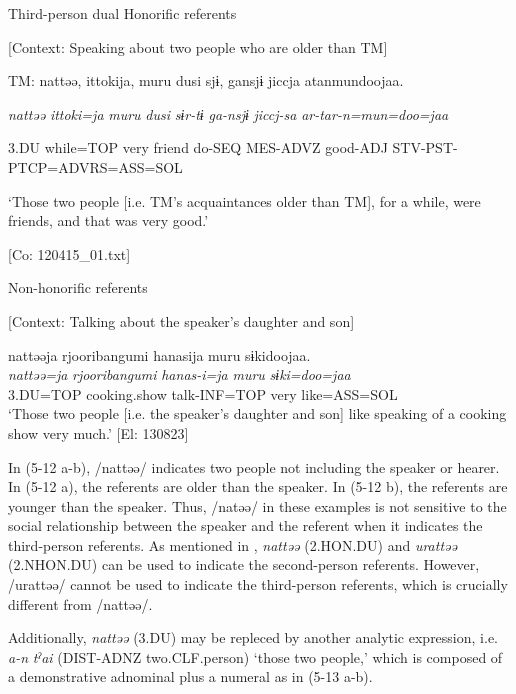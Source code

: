 \ea \label{ex:5:12}   Third-person dual
  \ea Honorific referents

  [Context: Speaking about two people who are older than TM]

  TM:  nattəə,  {\textbar}ittoki{\textbar}ja,  muru  dusi  sjɨ,  gansjɨ  jiccja atanmundoojaa.
                                                                                                                            
    \textit{nattəə}  \textit{ittoki=ja}  \textit{muru}  \textit{dusi}  \textit{sɨr-tɨ}  \textit{ga-nsjɨ}  \textit{jiccj-sa} \textit{ar-tar-n=mun=doo=jaa}
                                                                                                                            
    3.DU  while=TOP  very  friend  do-SEQ  MES-ADVZ  good-ADJ  STV-PST-PTCP=ADVRS=ASS=SOL
    
    ‘Those two people [i.e. TM’s acquaintances older than TM], for a while, were friends, and that was very good.’

    [Co: 120415\_01.txt]

  \ex Non-honorific referents

  [Context: Talking about the speaker’s daughter and son]

\glll  nattəəja  {\textbar}rjooribangumi{\textbar}  hanasija  muru  sɨkidoojaa.\\
\textit{nattəə=ja}  \textit{rjooribangumi}  \textit{hanas-i=ja}  \textit{muru}  \textit{sɨki=doo=jaa}\\
3.DU=TOP  cooking.show  talk-INF=TOP  very  like=ASS=SOL\\
\glt ‘Those two people [i.e. the speaker’s daughter and son] like speaking of a cooking show very much.’ [El: 130823]
\z
\z

In (5-12 a-b), /nattəə/ indicates two people not including the speaker or hearer. In (5-12 a), the referents are older than the speaker. In (5-12 b), the referents are younger than the speaker. Thus, /natəə/ in these examples is not sensitive to the social relationship between the speaker and the referent when it indicates the third-person referents. As mentioned in , \textit{nattəə} (2.HON.DU) and \textit{urattəə} (2.NHON.DU) can be used to indicate the second-person referents. However, /urattəə/ cannot be used to indicate the third-person referents, which is crucially different from /nattəə/.

Additionally, \textit{nattəə} (3.DU) may be repleced by another analytic expression, i.e. \textit{a-n} \textit{tˀai} (DIST-ADNZ two.CLF.person) ‘those two people,’ which is composed of a demonstrative adnominal plus a numeral as in (5-13 a-b).

